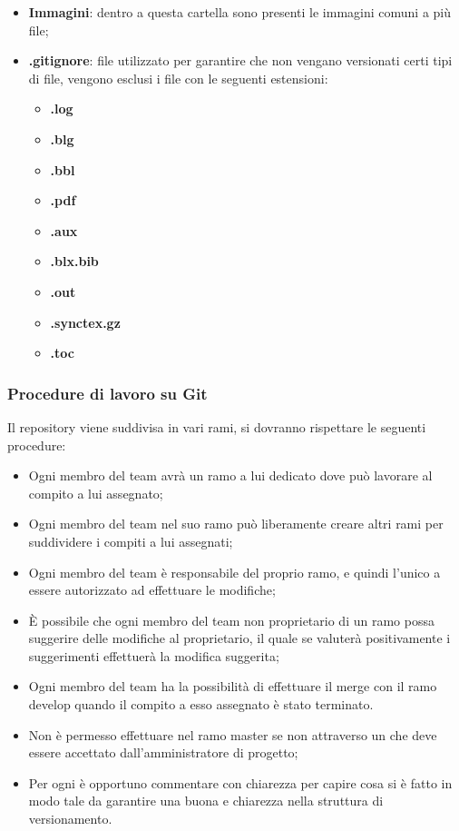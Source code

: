 \begin{itemize}
	\item \textbf{Immagini}: dentro a questa cartella sono presenti le immagini comuni a più file;
	\item \textbf{.gitignore}: file utilizzato per garantire che non vengano versionati certi tipi di file, vengono esclusi i file con le seguenti estensioni:
	\begin{itemize} 
		\item \textbf{.log}
		\item \textbf{.blg}
		\item \textbf{.bbl}
		\item \textbf{.pdf}
		\item \textbf{.aux}
		\item \textbf{.blx.bib}
		\item \textbf{.out}
		\item \textbf{.synctex.gz}
		\item \textbf{.toc}
	\end{itemize}
\end{itemize}
\subsubsection{Procedure di lavoro su Git}
Il repository viene suddivisa in vari rami, si dovranno rispettare le seguenti procedure:
\begin{itemize} 
\item Ogni membro del team avrà un ramo a lui dedicato dove può lavorare al compito a lui assegnato;
\item Ogni membro del team nel suo ramo può liberamente creare altri rami per suddividere i compiti a lui assegnati;
\item Ogni membro del team è responsabile del proprio ramo, e quindi l’unico a essere autorizzato ad effettuare le modifiche;
\item È possibile che ogni membro del team non proprietario di un ramo possa suggerire delle modifiche al proprietario, il quale se valuterà positivamente i suggerimenti effettuerà la modifica suggerita;
\item Ogni membro del team ha la possibilità di effettuare il merge con il ramo develop quando il compito a esso assegnato è stato terminato.
\item Non è permesso effettuare  nel ramo master se non attraverso un   che deve essere accettato dall’amministratore di progetto;
\item Per ogni  è opportuno commentare con chiarezza per capire cosa si è fatto in modo tale da garantire una buona  e chiarezza nella struttura di versionamento.
\end{itemize}
